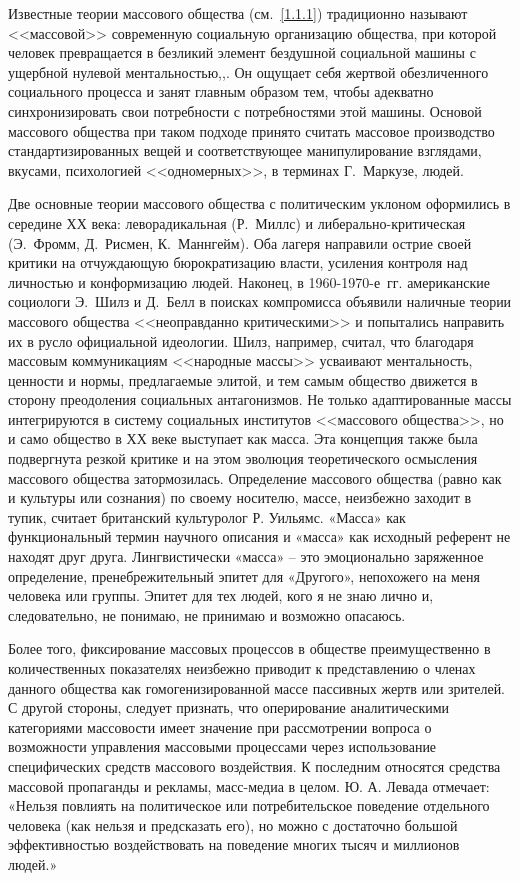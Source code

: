 Известные теории массового общества (см.~\ref{1.1.1}) традиционно называют <<массовой>>
современную социальную организацию общества, при которой человек превращается в безликий
элемент бездушной социальной машины с ущербной нулевой ментальностью\autocite{macdonald2011},\autocite[][3-30]{leavis1930},\autocite[][79-202]{eliot2010}. Он ощущает себя жертвой обезличенного социального процесса и занят главным образом тем, чтобы адекватно синхронизировать свои потребности с потребностями этой машины. Основой массового общества при таком подходе принято считать массовое производство стандартизированных вещей и соответствующее манипулирование взглядами, вкусами, психологией <<одномерных>>, в терминах Г.~Маркузе, людей.

Две основные теории массового общества
с политическим уклоном оформились в середине ХХ века: леворадикальная (Р.~Миллс)
и либерально-критическая (Э.~Фромм, Д.~Рисмен, К.~Маннгейм). Оба лагеря направили острие своей критики
на отчуждающую бюрократизацию власти, усиления контроля над личностью и конформизацию людей.
Наконец, в 1960-1970-е~гг. американские социологи Э.~Шилз и Д.~Белл в поисках компромисса объявили
наличные теории массового общества <<неоправданно критическими>> и попытались направить их в русло
официальной идеологии. Шилз, например, считал, что благодаря массовым коммуникациям <<народные массы>>
усваивают ментальность, ценности и нормы, предлагаемые элитой, и тем самым общество движется в сторону
преодоления социальных антагонизмов. Не только адаптированные массы интегрируются в систему
социальных институтов <<массового общества>>, но и само общество в ХХ веке выступает как масса.
Эта концепция также была подвергнута резкой критике и на этом эволюция теоретического осмысления массового
общества затормозилась. Определение массового общества (равно как и культуры или сознания) по своему носителю, массе, неизбежно заходит в тупик, считает британский культуролог Р.  Уильямс. «Масса» как функциональный термин научного описания и «масса» как исходный референт не находят друг друга. Лингвистически «масса» – это эмоционально заряженное определение, пренебрежительный эпитет для «Другого», непохожего на меня человека или группы. Эпитет для тех людей, кого я не знаю лично и, следовательно, не понимаю, не принимаю и возможно опасаюсь.\autocite{williams1985}\autocite{williams1989}\autocite{williams2006}

Более того, фиксирование массовых процессов в обществе преимущественно в количественных показателях неизбежно приводит к представлению о членах данного общества как гомогенизированной массе пассивных жертв или зрителей.\autocite{levada2001} С другой стороны, следует признать, что оперирование аналитическими категориями массовости   имеет значение при рассмотрении вопроса о возможности управления массовыми процессами через использование специфических средств массового воздействия. К последним относятся средства массовой пропаганды и рекламы, масс-медиа в целом. Ю. А. Левада отмечает: «Нельзя повлиять на политическое или потребительское поведение отдельного человека (как нельзя и предсказать его), но можно с достаточно большой эффективностью воздействовать на поведение многих тысяч и миллионов людей.»\autocite{levada2001} 

